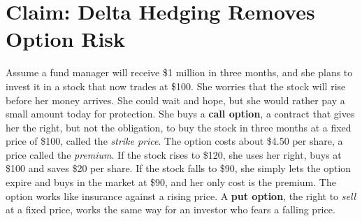\makeatletter
{}
\makeatother

\makeatletter
\makeatother

\chapter{Claim: Delta Hedging Removes Option Risk}
\label{ch:17}
\providecommand{\term}[1]{\emph{#1}}

Assume a fund manager will receive \$1 million in three months, and she plans to invest it in a stock that now trades at \$100. She worries that the stock will rise before her money arrives. She could wait and hope, but she would rather pay a small amount today for protection. She buys a \textbf{call option}, a contract that gives her the right, but not the obligation, to buy the stock in three months at a fixed price of \$100, called the \term{strike price}. The option costs about \$4.50 per share, a price called the \term{premium}. If the stock rises to \$120, she uses her right, buys at \$100 and saves \$20 per share. If the stock falls to \$90, she simply lets the option expire and buys in the market at \$90, and her only cost is the premium. The option works like insurance against a rising price. A \textbf{put option}, the right to \emph{sell} at a fixed price, works the same way for an investor who fears a falling price.

